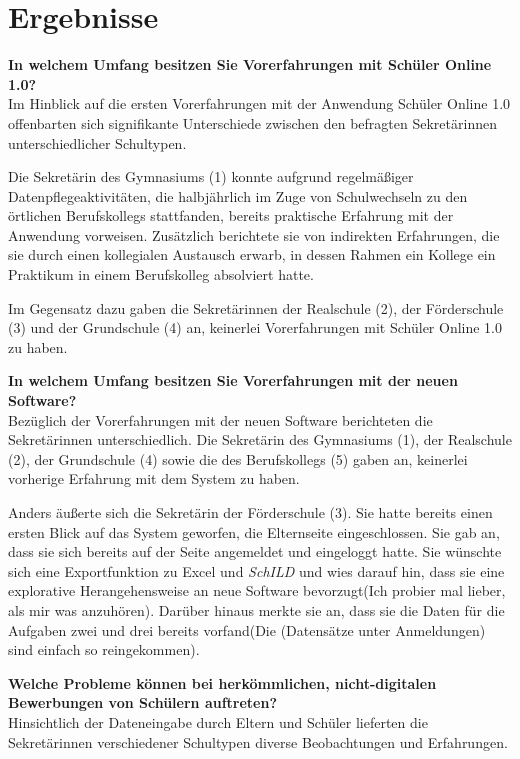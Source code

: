 \pagebreak
\section{Ergebnisse}

\textbf{In welchem Umfang besitzen Sie Vorerfahrungen mit Schüler Online 1.0?}\\
Im Hinblick auf die ersten Vorerfahrungen mit der Anwendung Schüler Online 1.0 offenbarten sich signifikante Unterschiede zwischen den befragten Sekretärinnen unterschiedlicher Schultypen.

Die Sekretärin des Gymnasiums (1) konnte aufgrund regelmäßiger Datenpflegeaktivitäten, die halbjährlich im Zuge von Schulwechseln zu den örtlichen Berufskollegs stattfanden, bereits praktische Erfahrung mit der Anwendung vorweisen. Zusätzlich berichtete sie von indirekten Erfahrungen, die sie durch einen kollegialen Austausch erwarb, in dessen Rahmen ein Kollege ein Praktikum in einem Berufskolleg absolviert hatte.

Im Gegensatz dazu gaben die Sekretärinnen der Realschule (2), der Förderschule (3) und der Grundschule (4) an, keinerlei Vorerfahrungen mit Schüler Online 1.0 zu haben.


\textbf{In welchem Umfang besitzen Sie Vorerfahrungen mit der neuen Software?}\\
Bezüglich der Vorerfahrungen mit der neuen Software berichteten die Sekretärinnen unterschiedlich. Die Sekretärin des Gymnasiums (1), der Realschule (2), der Grundschule (4) sowie die des Berufskollegs (5) gaben an, keinerlei vorherige Erfahrung mit dem System zu haben.

Anders äußerte sich die Sekretärin der Förderschule (3). Sie hatte bereits einen ersten Blick auf das System geworfen, die Elternseite eingeschlossen. Sie gab an, dass sie sich bereits auf der Seite angemeldet und eingeloggt hatte. Sie wünschte sich eine Exportfunktion zu Excel und \textit{SchILD} und wies darauf hin, dass sie eine explorative Herangehensweise an neue Software bevorzugt(\glqq Ich probier mal lieber, als mir was anzuhören\grqq{}). Darüber hinaus merkte sie an, dass sie die Daten für die Aufgaben zwei und drei bereits vorfand(\glqq Die (Datensätze unter Anmeldungen) sind einfach so reingekommen\grqq{}).

\textbf{Welche Probleme können bei herkömmlichen, nicht-digitalen Bewerbungen von Schülern auftreten?}\\
Hinsichtlich der Dateneingabe durch Eltern und Schüler lieferten die Sekretärinnen verschiedener Schultypen diverse Beobachtungen und Erfahrungen.

